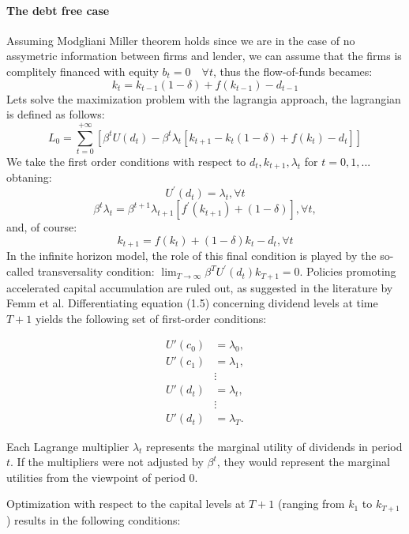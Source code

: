 \documentclass[12pt]{article}
\begin{document}
\paragraph{The debt free case}
Assuming Modgliani Miller theorem holds since we are in the case of no assymetric information between firms and lender,
we can assume that the firms is complitely financed with equity \(b_t=0 \quad \forall t\), thus the flow-of-funds
becames:
\[k_t = k_{t-1}(1 - \delta)+ f(k_{t-1}) - d_{t-1}\]
Lets solve the maximization problem with the lagrangia approach, the lagrangian is defined as follows:
\[L_0 = \sum_{t=0}^{+\infty}\left[{\beta^t U(d_t) - \beta^t \lambda_t\left[k_{t+1} - k_{t}(1 - \delta)+ f(k_t) -
d_t\right]}\right] \]
We take the first order conditions with respect to \(d_{t}, k_{t+1}, \lambda_t\) for \(t=0,1,...\) obtaning:
\[
U^{\prime}\left(d_{t}\right)=\lambda_t, \forall t
\]
\[
\beta^t \lambda_t=\beta^{t+1} \lambda_{t+1}\left[f^{\prime}\left(k_{t+1}\right)+(1-\delta)\right], \forall t,
\]
and, of course:
\[
k_{t+1}=f\left(k_t\right)+(1-\delta) k_t-d_{t}, \forall t
\]
In the infinite horizon model, the role of this final
condition is played by the so-called transversality condition:
$\lim _{T \rightarrow \infty} \beta^T U^{\prime}\left(d_{t}\right) k_{T+1}=0$.
Policies promoting accelerated capital accumulation are ruled out, as suggested in the literature by Femm et al.
Differentiating  equation (1.5) concerning dividend levels at time \(T+1\) yields the following set of first-order
conditions:

\begin{equation}
    \begin{aligned}
    U'(c_0) &= \lambda_0, \\
    U'(c_1) &= \lambda_1, \\
    & \vdots \\
    U'(d_{t}) &= \lambda_t, \\
    & \vdots \\
    U'(d_{t}) &= \lambda_T.
    \end{aligned}
\end{equation}

Each Lagrange multiplier \(\lambda_t\) represents the marginal utility of dividends in period \(t\). If the
multipliers were not  adjusted by \(\beta^t\), they would represent the marginal utilities from the viewpoint of period
0.

Optimization with respect to the capital levels at \(T+1\) (ranging from \(k_1\) to \(k_{T+1}\)) results in the following conditions:
\end{document}
